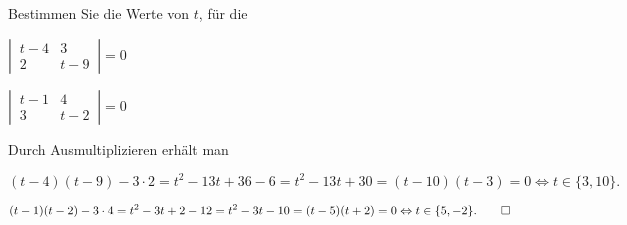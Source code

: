 %
%
Bestimmen Sie die Werte von $t$, für die
\begin{teilaufgaben}
\item
$
\left|\,\begin{matrix}
t-4&3\\2&t-9
\end{matrix}\,\right|=0
$
\item
$
\left|\,\begin{matrix}
t-1&4\\3&t-2
\end{matrix}\,\right|=0
$
\end{teilaufgaben}


\begin{loesung}
Durch Ausmultiplizieren erhält man
\begin{teilaufgaben}
\item
\[
(t-4)(t-9)-3\cdot 2=t^2 -13t +36-6=t^2-13t+30=(t-10)(t-3)=0\Leftrightarrow t\in\{3,10\}.
\]
\item
\[
(t-1)(t-2)-3\cdot 4=t^2-3t+2-12=t^2-3t-10=(t-5)(t+2)=0\Leftrightarrow t\in\{5,-2\}.
\qedhere
\]
\end{teilaufgaben}
\end{loesung}

